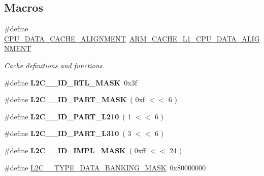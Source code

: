 \subsection*{Macros}
\begin{DoxyCompactItemize}
\item 
\#define \mbox{\hyperlink{group__L2C-310__cache_gad8b098569fd4a1d9ae5a3030b66ac6f8}{C\+P\+U\+\_\+\+D\+A\+T\+A\+\_\+\+C\+A\+C\+H\+E\+\_\+\+A\+L\+I\+G\+N\+M\+E\+NT}}~\mbox{\hyperlink{group__RTEMSBSPsARMShared_gaca3a3025c199b251e7278a8987c3aab1}{A\+R\+M\+\_\+\+C\+A\+C\+H\+E\+\_\+\+L1\+\_\+\+C\+P\+U\+\_\+\+D\+A\+T\+A\+\_\+\+A\+L\+I\+G\+N\+M\+E\+NT}}
\begin{DoxyCompactList}\small\item\em Cache definitions and functions. \end{DoxyCompactList}\item 
\mbox{\label{group__L2C-310__cache_gaefcb1a8f0d9def441698f339e5b03aa4}} 
\#define {\bfseries L2\+C\+\_\+\_\+\+I\+D\+\_\+\+R\+T\+L\+\_\+\+M\+A\+SK}~0x3f
\item 
\mbox{\label{group__L2C-310__cache_ga0db832cb2cdca4259815eace3e336fee}} 
\#define {\bfseries L2\+C\+\_\+\_\+\+I\+D\+\_\+\+P\+A\+R\+T\+\_\+\+M\+A\+SK}~( 0xf $<$$<$ 6 )
\item 
\mbox{\label{group__L2C-310__cache_ga7e21974b8b3edf6b35ab5722f63229bb}} 
\#define {\bfseries L2\+C\+\_\+\_\+\+I\+D\+\_\+\+P\+A\+R\+T\+\_\+\+L210}~( 1 $<$$<$ 6 )
\item 
\mbox{\label{group__L2C-310__cache_ga2764bf4f25252b834b386ee5ffff1123}} 
\#define {\bfseries L2\+C\+\_\+\_\+\+I\+D\+\_\+\+P\+A\+R\+T\+\_\+\+L310}~( 3 $<$$<$ 6 )
\item 
\mbox{\label{group__L2C-310__cache_ga2fa35194b9af6f47b0b4653b7e9107f8}} 
\#define {\bfseries L2\+C\+\_\+\_\+\+I\+D\+\_\+\+I\+M\+P\+L\+\_\+\+M\+A\+SK}~( 0xff $<$$<$ 24 )
\item 
\mbox{\label{group__L2C-310__cache_gad173c1b1d5bc9455e2c16cdf76682365}} 
\#define \mbox{\hyperlink{group__L2C-310__cache_gad173c1b1d5bc9455e2c16cdf76682365}{L2\+C\+\_\+\_\+\+T\+Y\+P\+E\+\_\+\+D\+A\+T\+A\+\_\+\+B\+A\+N\+K\+I\+N\+G\+\_\+\+M\+A\+SK}}~0x80000000

\end{DoxyCompactItemize}
